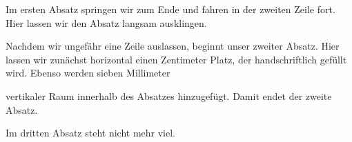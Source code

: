 \documentclass[a4paper, 12pt]{article} %
\begin{document}

Im ersten Absatz springen wir \hfill zum Ende \linebreak
und fahren in der zweiten Zeile fort. Hier lassen wir den Absatz langsam 
ausklingen.\par\bigskip

Nachdem wir ungefähr eine Zeile auslassen, beginnt unser zweiter Absatz. Hier
lassen wir zunächst horizontal einen Zentimeter \hspace*{1cm} Platz, der
handschriftlich gefüllt wird. Ebenso werden sieben Millimeter\vspace{7mm}

vertikaler Raum innerhalb des Absatzes hinzugefügt. Damit endet der
zweite Absatz.\par

Im dritten Absatz steht nicht mehr viel.
\end{document}
